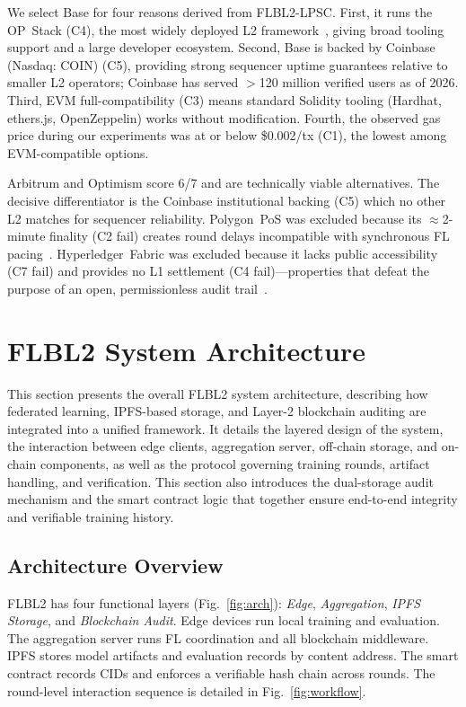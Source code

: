 \documentclass{llncs}
\begin{document}
We select Base for four reasons derived from FLBL2-LPSC.
First, it runs the OP~Stack (C4), the most
widely deployed L2 framework~\cite{zhao2024l2intro,neiheiser2023l2limits},
giving broad tooling support and a large developer ecosystem.
Second, Base is backed by Coinbase (Nasdaq: COIN) (C5), providing
strong sequencer uptime guarantees relative to smaller L2 operators;
Coinbase has served $>$120 million verified users as of 2026.
Third, EVM full-compatibility (C3) means standard Solidity tooling
(Hardhat, ethers.js, OpenZeppelin) works without modification.
Fourth, the observed gas price during our experiments was at or below
\$0.002/tx (C1), the lowest among EVM-compatible options.

Arbitrum and Optimism score 6/7 and are technically viable alternatives. The decisive differentiator is the Coinbase institutional backing (C5)
which no other L2 matches for sequencer reliability. Polygon~PoS was
excluded because its $\approx$2-minute finality (C2 fail) creates round
delays incompatible with synchronous FL pacing~\cite{mandal2023l2}.
Hyperledger~Fabric was excluded because it lacks public accessibility
(C7 fail) and provides no L1 settlement (C4 fail)---properties that
defeat the purpose of an open, permissionless audit trail~\cite{bayan2023exploring}.


\FloatBarrier
\section{FLBL2 System Architecture}
\label{sec:arch}
This section presents the overall FLBL2 system architecture, describing how federated learning, IPFS-based storage, and Layer-2 blockchain auditing are integrated into a unified framework. It details the layered design of the system, the interaction between edge clients, aggregation server, off-chain storage, and on-chain components, as well as the protocol governing training rounds, artifact handling, and verification. This section also introduces the dual-storage audit mechanism and the smart contract logic that together ensure end-to-end integrity and verifiable training history.

\subsection{Architecture Overview}
FLBL2 has four functional layers (Fig.~\ref{fig:arch}): \emph{Edge},
\emph{Aggregation}, \emph{IPFS Storage}, and \emph{Blockchain Audit}.
Edge devices run local training and evaluation. The aggregation server
runs FL coordination and all blockchain middleware. IPFS stores model
artifacts and evaluation records by content address. The smart contract
records CIDs and enforces a verifiable hash chain across rounds.
The round-level interaction sequence is detailed in Fig.~\ref{fig:workflow}.
\end{document}
